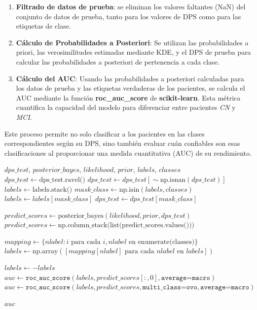 \begin{enumerate}
\item \textbf{Filtrado de datos de prueba}: se eliminan los valores faltantes (NaN) del conjunto de datos de prueba, tanto para los valores de DPS como para las etiquetas de clase.


\item \textbf{Cálculo de Probabilidades a Posteriori}:
Se utilizan las probabilidades a priori, las verosimilitudes estimadas mediante KDE, y el DPS de prueba para calcular las probabilidades a posteriori de pertenencia a cada clase.

\item \textbf{Cálculo del AUC}:
Usando las probabilidades a posteriori calculadas para los datos de prueba y las etiquetas verdaderas de los pacientes, se calcula el AUC mediante la función \textbf{roc\_auc\_score} de \textbf{scikit-learn}. Esta métrica cuantifica la capacidad del modelo para diferenciar entre pacientes \textit{CN} y \textit{MCI}.\\

\end{enumerate}

Este proceso permite no solo clasificar a los pacientes en las clases correspondientes según su DPS, sino también evaluar cuán confiables son esas clasificaciones al proporcionar una medida cuantitativa (AUC) de su rendimiento.

\begin{algorithm}
	\caption{Cálculo del AUC con un Clasificador Bayesiano}
	\begin{algorithmic}[1]
		\REQUIRE $dps\_test$, $posterior\_bayes$, $likelihood$, $prior$, $labels$, $classes$
		\STATE $dps\_test \gets \text{dps\_test.ravel()}$
		\STATE $dps\_test \gets dps\_test[\sim\text{np.isnan}(dps\_test)]$
		\STATE $labels \gets \text{labels.stack()}$
		\STATE $mask\_class \gets \text{np.isin}(labels, classes)$
		\STATE $labels \gets labels[mask\_class]$
		\STATE $dps\_test \gets dps\_test[mask\_class]$
		
		\STATE $predict\_scores \gets \text{posterior\_bayes}(likelihood, prior, dps\_test)$
		\STATE $predict\_scores \gets \text{np.column\_stack(list(predict\_scores.values()))}$
		
		\STATE $mapping \gets \{nlabel: i \text{ para cada } i, nlabel \text{ en enumerate(classes)}\}$
		\STATE $labels \gets \text{np.array}([mapping[nlabel] \text{ para cada } nlabel \text{ en } labels])$
		
		\STATE $labels \gets -labels$
		\STATE $auc \gets \texttt{roc\_auc\_score}(labels, predict\_scores[:, 0], \texttt{average=macro})$
		\ELSE
		\STATE $auc \gets \texttt{roc\_auc\_score}(labels, predict\_scores, \texttt{multi\_class=ovo}, \texttt{average=macro})$
		\ENDIF
		
		\RETURN $auc$
	\end{algorithmic}
\end{algorithm}

